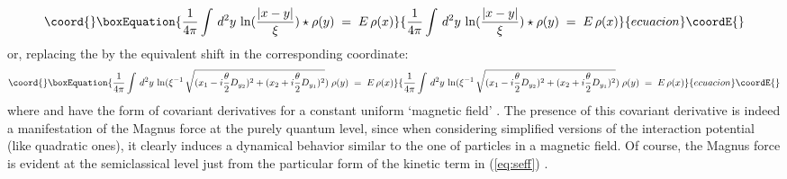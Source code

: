 \documentclass[a4paper,12pt]{article} \tolerance=200
\begin{document}
\begin{equation}\coord{}\boxEquation{
\frac{1}{4\pi}\int\, d^2y\,  \ln (\frac{|x-y|}{\xi}) \star \rho (y) \;=\; E \, \rho (x) 
}{
\frac{1}{4\pi}\int\, d^2y\,  \ln (\frac{|x-y|}{\xi}) \star \rho (y) \;=\; E \, \rho (x) 
}{ecuacion}\coordE{}\end{equation}  
or, replacing the \myHighlight{$*$}\coordHE{} by the equivalent shift in the corresponding
coordinate:
\begin{equation}\coord{}\boxEquation{
\frac{1}{4\pi}\int\, d^2y\,  \ln (
\xi^{-1}\, \sqrt{(x_1-i\frac{\theta}{2} D_{y_2})^2 + (x_2+i\frac{\theta}{2} D_{y_1})^2})\; \rho (y) 
\;=\; E \, \rho (x) 
}{
\frac{1}{4\pi}\int\, d^2y\,  \ln (
\xi^{-1}\, \sqrt{(x_1-i\frac{\theta}{2} D_{y_2})^2 + (x_2+i\frac{\theta}{2} D_{y_1})^2})\; \rho (y) 
\;=\; E \, \rho (x) 
}{ecuacion}\coordE{}\end{equation}
where \coordHE{} and \coordHE{} have the form of covariant derivatives for a
constant uniform `magnetic field' \coordHE{}.  The presence of
this covariant derivative is indeed a manifestation of the Magnus
force at the purely quantum level, since when considering simplified
versions of the interaction potential (like quadratic ones), it
clearly induces a dynamical behavior similar to the one of particles
in a magnetic field. Of course, the Magnus force is evident at the
semiclassical level just from the particular form of the kinetic term
in (\ref{eq:seff}) \cite{MS}.
\end{document}
